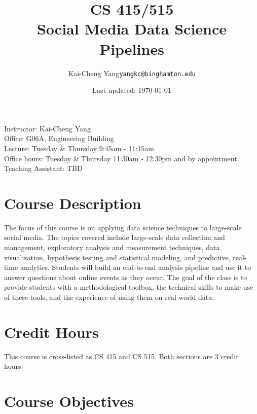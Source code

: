 \documentclass[11pt,article,oneside]{memoir} %
\makeatletter
\def\myauthor{Author}
\def\mytitle{Title}
\def\myemail{yangkc@binghamton.edu}
\def\myauthor{Kai-Cheng Yang}
\def\mytitle{{\normalsize CS 415/515} \\ \HUGE{} Social Media Data Science Pipelines}
\makeatother
\begin{document}

\title{\LARGE \mytitle} %
\author{\Large\myauthor\newline \footnotesize\texttt{\noindent\myemail}}
\date{Last updated: \today}


\maketitle

Instructor: \myauthor \\
Office: G06A, Engineering Building \\
Lecture: Tuesday \& Thursday 9:45am - 11:15am \\
Office hours: Tuesday \& Thursday 11:30am - 12:30pm and by appointment \\

Teaching Assistant: TBD \\

\section{Course Description}%

The focus of this course is on applying data science techniques to large-scale social media.
The topics covered include large-scale data collection and management, exploratory analysis and measurement techniques, data visualization, hypothesis testing and statistical modeling, and predictive, real-time analytics.
Students will build an end-to-end analysis pipeline and use it to answer questions about online events as they occur.
The goal of the class is to provide students with a methodological toolbox, the technical skills to make use of these tools, and the experience of using them on real world data.


\section{Credit Hours}

This course is cross-listed as CS 415 and CS 515.
Both sections are 3 credit hours.

\section{Course Objectives}%
\end{document}
